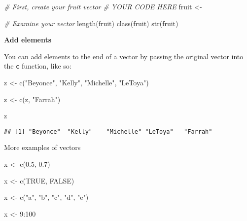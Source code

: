 \documentclass[
]{book}
\newenvironment{Shaded}{\begin{snugshade}}{\end{snugshade}}
\newcommand{\CommentTok}[1]{\textcolor[rgb]{0.56,0.35,0.01}{\textit{#1}}}
\newcommand{\ConstantTok}[1]{\textcolor[rgb]{0.00,0.00,0.00}{#1}}
\newcommand{\DecValTok}[1]{\textcolor[rgb]{0.00,0.00,0.81}{#1}}
\newcommand{\FloatTok}[1]{\textcolor[rgb]{0.00,0.00,0.81}{#1}}
\newcommand{\FunctionTok}[1]{\textcolor[rgb]{0.00,0.00,0.00}{#1}}
\newcommand{\NormalTok}[1]{#1}
\newcommand{\OtherTok}[1]{\textcolor[rgb]{0.56,0.35,0.01}{#1}}
\newcommand{\SpecialCharTok}[1]{\textcolor[rgb]{0.00,0.00,0.00}{#1}}
\newcommand{\StringTok}[1]{\textcolor[rgb]{0.31,0.60,0.02}{#1}}
\begin{document}
\begin{Shaded}
\begin{Highlighting}[]
\CommentTok{\# First, create your fruit vector}
\CommentTok{\# YOUR CODE HERE}
\NormalTok{fruit }\OtherTok{\textless{}{-}}

  \CommentTok{\# Examine your vector}
  \FunctionTok{length}\NormalTok{(fruit)}
\FunctionTok{class}\NormalTok{(fruit)}
\FunctionTok{str}\NormalTok{(fruit)}
\end{Highlighting}
\end{Shaded}

\textbf{Add elements}

You can add elements to the end of a vector by passing the original vector into the \texttt{c} function, like so:

\begin{Shaded}
\begin{Highlighting}[]
\NormalTok{z }\OtherTok{\textless{}{-}} \FunctionTok{c}\NormalTok{(}\StringTok{"Beyonce"}\NormalTok{, }\StringTok{"Kelly"}\NormalTok{, }\StringTok{"Michelle"}\NormalTok{, }\StringTok{"LeToya"}\NormalTok{)}

\NormalTok{z }\OtherTok{\textless{}{-}} \FunctionTok{c}\NormalTok{(z, }\StringTok{"Farrah"}\NormalTok{)}

\NormalTok{z}
\end{Highlighting}
\end{Shaded}

\begin{verbatim}
## [1] "Beyonce"  "Kelly"    "Michelle" "LeToya"   "Farrah"
\end{verbatim}

More examples of vectors

\begin{Shaded}
\begin{Highlighting}[]
\NormalTok{x }\OtherTok{\textless{}{-}} \FunctionTok{c}\NormalTok{(}\FloatTok{0.5}\NormalTok{, }\FloatTok{0.7}\NormalTok{)}

\NormalTok{x }\OtherTok{\textless{}{-}} \FunctionTok{c}\NormalTok{(}\ConstantTok{TRUE}\NormalTok{, }\ConstantTok{FALSE}\NormalTok{)}

\NormalTok{x }\OtherTok{\textless{}{-}} \FunctionTok{c}\NormalTok{(}\StringTok{"a"}\NormalTok{, }\StringTok{"b"}\NormalTok{, }\StringTok{"c"}\NormalTok{, }\StringTok{"d"}\NormalTok{, }\StringTok{"e"}\NormalTok{)}

\NormalTok{x }\OtherTok{\textless{}{-}} \DecValTok{9}\SpecialCharTok{:}\DecValTok{100}
\end{Highlighting}
\end{Shaded}
\end{document}
